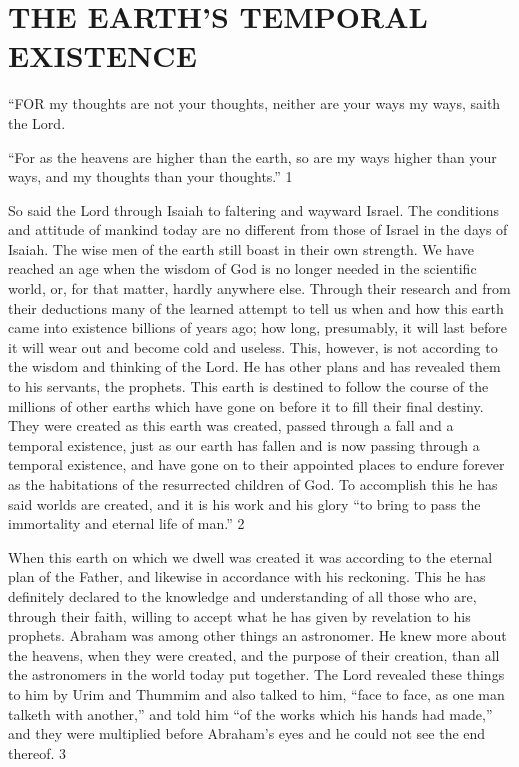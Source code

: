 \chapter{THE EARTH'S TEMPORAL EXISTENCE}

``FOR my thoughts are not your thoughts, neither are your ways my ways, saith the Lord.

``For as the heavens are higher than the earth, so are my ways higher than your ways, and my
thoughts than your thoughts.'' 1

So said the Lord through Isaiah to faltering and wayward Israel. The conditions and attitude
of mankind today are no different from those of Israel in the days of Isaiah. The wise men of
the earth still boast in their own strength. We have reached an age when the wisdom of God
is no longer needed in the scientific world, or, for that matter, hardly anywhere else. Through
their research and from their deductions many of the learned attempt to tell us when and how
this earth came into existence billions of years ago; how long, presumably, it will last before
it will wear out and become cold and useless. This, however, is not according to the wisdom
and thinking of the Lord. He has other plans and has revealed them to his servants, the
prophets. This earth is destined to follow the course of the millions of other earths which
have gone on before it to fill their final destiny. They were created as this earth was created,
passed through a fall and a temporal existence, just as our earth has fallen and is now passing
through a temporal existence, and have gone on to their appointed places to endure forever as
the habitations of the resurrected children of God. To accomplish this he has said worlds are
created, and it is his work and his glory ``to bring to pass the immortality and eternal life of
man.'' 2

When this earth on which we dwell was created it was according to the eternal plan of the
Father, and likewise in accordance with his reckoning. This he has definitely declared to the
knowledge and understanding of all those who are, through their faith, willing to accept what
he has given by revelation to his prophets. Abraham was among other things an astronomer.
He knew more about the heavens, when they were created, and the purpose of their creation,
than all the astronomers in the world today put together. The Lord revealed these things to
him by Urim and Thummim and also talked to him, ``face to face, as one man talketh with
another,'' and told him ``of the works which his hands had made,'' and they were multiplied
before Abraham's eyes and he could not see the end thereof. 3

